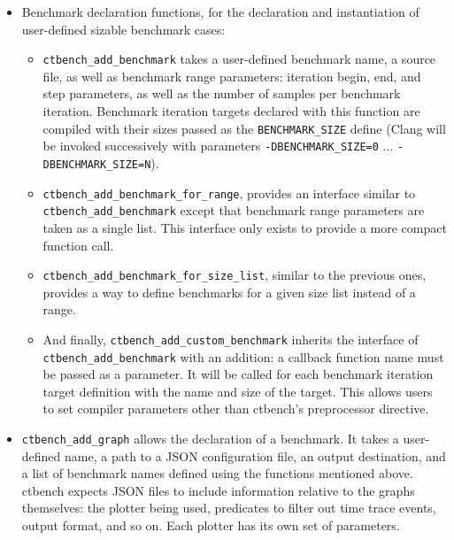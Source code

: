 \documentclass[../main]{subfiles}
\begin{document}
\begin{itemize}

\item Benchmark declaration functions, for the declaration and instantiation
of user-defined sizable benchmark cases:

  \begin{itemize}

  \item
  \lstinline{ctbench_add_benchmark} takes a user-defined benchmark name,
  a \cpp source file, as well as benchmark range parameters: iteration begin,
  end, and step parameters, as well as the number of samples per benchmark
  iteration. Benchmark iteration targets declared with this function are
  compiled with their sizes passed as the \lstinline{BENCHMARK_SIZE} define
  (\ie Clang will be invoked successively with parameters
  \lstinline{-DBENCHMARK_SIZE=0} ... \lstinline{-DBENCHMARK_SIZE=N}).

  \item
  \lstinline{ctbench_add_benchmark_for_range}, provides an interface similar to
  \lstinline{ctbench_add_benchmark} except that benchmark range parameters
  are taken as a single list. This interface only exists to provide a more
  compact function call.

  \item
  \lstinline{ctbench_add_benchmark_for_size_list}, similar to the previous ones,
  provides a way to define benchmarks for a given size list instead of a range.

  \item
  And finally, \lstinline{ctbench_add_custom_benchmark} inherits
  the interface of \lstinline{ctbench_add_benchmark} with an addition:
  a callback function name must be passed as a parameter. It will be called
  for each benchmark iteration target definition with the name and size of the
  target. This allows users to set compiler parameters other than ctbench's
  preprocessor directive.

  \end{itemize}

\item
\lstinline{ctbench_add_graph} allows the declaration of a benchmark.
It takes a user-defined name, a path to a JSON configuration file,
an output destination, and a list of benchmark names defined using the
functions mentioned above. ctbench expects JSON files to include information
relative to the graphs themselves: the plotter being used, predicates
to filter out time trace events, output format, and so on.
Each plotter has its own set of parameters.


\end{itemize}
\end{document}
